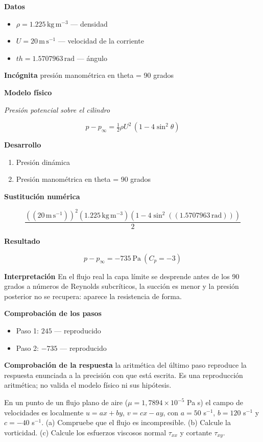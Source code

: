 \documentclass[10pt,openany]{book}
\begin{document}
\noindent\textbf{Datos}
\begin{itemize}
\item $\rho = 1.225\,\mathrm{kg}\,\mathrm{m}^{-3}$ — densidad
\item $U = 20\,\mathrm{m}\,\mathrm{s}^{-1}$ — velocidad de la corriente
\item $th = 1.5707963\,\mathrm{rad}$ — ángulo
\end{itemize}

\noindent\textbf{Incógnita}
presión manométrica en theta = 90 grados

\noindent\textbf{Modelo físico}

\noindent\textit{Presión potencial sobre el cilindro}

\[
p - p_\infty = \tfrac12\rho U^{2}\,(1 - 4\sin^{2}\theta)
\]

\noindent\textbf{Desarrollo}
\begin{enumerate}
\item
Presión dinámica
\item
Presión manométrica en theta = 90 grados
\end{enumerate}

\noindent\textbf{Sustitución numérica}

\[
\frac{\left(\left(20\,\mathrm{m}\,\mathrm{s}^{-1}\right)\right)^{2} \left(1.225\,\mathrm{kg}\,\mathrm{m}^{-3}\right) \left(1 - 4 \sin^{2}{\left(\left(1.5707963\,\mathrm{rad}\right) \right)}\right)}{2}
\]

\noindent\textbf{Resultado}

\[
p - p_\infty = -735\ \mathrm{Pa}\ (C_p = -3)
\]

\noindent\textbf{Interpretación}
En el flujo real la capa límite se desprende antes de los 90 grados a números de Reynolds subcríticos, la succión es menor y la presión posterior no se recupera: aparece la resistencia de forma.

\noindent\textbf{Comprobación de los pasos}
\begin{itemize}
\item Paso 1: $245$ — reproducido
\item Paso 2: $-735$ — reproducido
\end{itemize}

\noindent\textbf{Comprobación de la respuesta} la aritmética del último paso reproduce la respuesta enunciada a la precisión con que está escrita. Es una reproducción aritmética; no valida el modelo físico ni sus hipótesis.

En un punto de un flujo plano de aire (\(\mu = 1{,}7894\times 10^{-5}\) Pa s) el campo de velocidades es localmente \(u = ax + by\), \(v = cx - ay\), con \(a = 50\) s\(^{-1}\), \(b = 120\) s\(^{-1}\) y \(c = -40\) s\(^{-1}\). (a) Compruebe que el flujo es incompresible. (b) Calcule la vorticidad. (c) Calcule los esfuerzos viscosos normal \(\tau_{xx}\) y cortante \(\tau_{xy}\).
\end{document}

